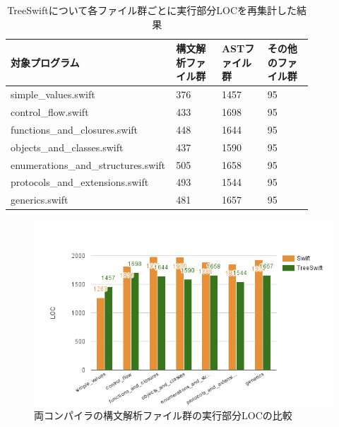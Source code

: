\begin{table}[!hbtp]
    \begin{center}
        \caption{TreeSwiftについて各ファイル群ごとに実行部分LOCを再集計した結果}
        \begin{tabular}{|p{0.4\linewidth}|p{0.15\linewidth}|p{0.15\linewidth}|p{0.15\linewidth}|}
            \hline
            対象プログラム & 構文解析ファイル群 & ASTファイル群 & その他のファイル群\\
            \hline
            \hline
            simple\_values.swift & 376 & 1457 & 95\\
            \hline
            control\_flow.swift & 433 & 1698 & 95\\
            \hline
            functions\_and\_closures.swift & 448 & 1644 & 95\\
            \hline
            objects\_and\_classes.swift & 437 & 1590 & 95\\
            \hline
            enumerations\_and\_structures.swift & 505 & 1658 & 95\\
            \hline
            protocols\_and\_extensions.swift & 493 & 1544 & 95\\
            \hline
            generics.swift & 481 & 1657 & 95\\
            \hline
        \end{tabular}
        \label{table:loc-treeswift-per-file}
    \end{center}
\end{table}

\begin{figure}
    \begin{center}
        \includegraphics[scale=0.8]{./img/parse_loc_result.png}
        \caption{両コンパイラの構文解析ファイル群の実行部分LOCの比較}
        \label{img:parse-loc-result}
    \end{center}
\end{figure}


